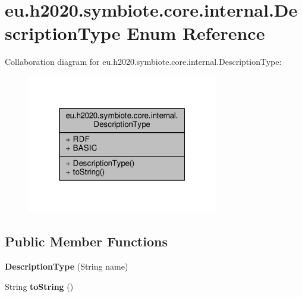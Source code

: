 \hypertarget{enumeu_1_1h2020_1_1symbiote_1_1core_1_1internal_1_1DescriptionType}{}\section{eu.\+h2020.\+symbiote.\+core.\+internal.\+Description\+Type Enum Reference}
\label{enumeu_1_1h2020_1_1symbiote_1_1core_1_1internal_1_1DescriptionType}


Collaboration diagram for eu.\+h2020.\+symbiote.\+core.\+internal.\+Description\+Type\+:\nopagebreak
\begin{figure}[H]
\begin{center}
\leavevmode
\includegraphics[width=236pt]{enumeu_1_1h2020_1_1symbiote_1_1core_1_1internal_1_1DescriptionType__coll__graph}
\end{center}
\end{figure}
\subsection*{Public Member Functions}
\begin{DoxyCompactItemize}
\item 
\mbox{\label{enumeu_1_1h2020_1_1symbiote_1_1core_1_1internal_1_1DescriptionType_a27392c775b612f7526bf1ccbea87db7a}} 
{\bfseries Description\+Type} (String name)
\item 
\mbox{\label{enumeu_1_1h2020_1_1symbiote_1_1core_1_1internal_1_1DescriptionType_a9076432c04e23d61ffd25498990f1766}} 
String {\bfseries to\+String} ()
\end{DoxyCompactItemize}
